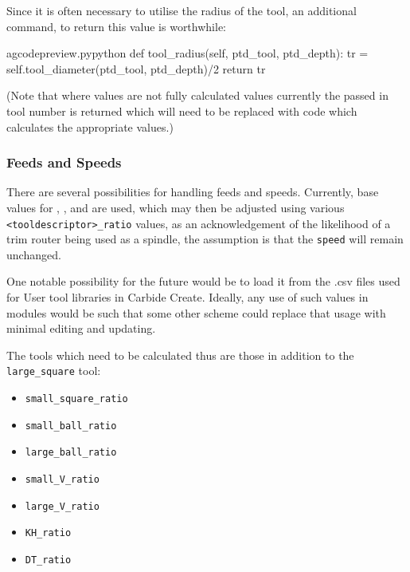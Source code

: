 \documentclass{ltxdoc}
\begin{document}
Since it is often necessary to utilise the radius of the tool, an additional command,  to return this value is worthwhile:
 
\lstset{firstnumber=\thegcpy}
\begin{writecode}{a}{gcodepreview.py}{python}
    def tool_radius(self, ptd_tool, ptd_depth):
        tr = self.tool_diameter(ptd_tool, ptd_depth)/2
        return tr

\end{writecode}
\addtocounter{gcpy}{4}
 
(Note that where values are not fully calculated values currently the passed in tool number is returned which will need to be replaced with code which calculates the appropriate values.)

\subsubsection{Feeds and Speeds}

There are several possibilities for handling feeds and speeds. Currently, base values for , , and  are used, which may then be adjusted using various \verb|<tooldescriptor>_ratio| values, as an acknowledgement of the likelihood of a trim router being used as a spindle, the assumption is that the \texttt{speed} will remain unchanged.

One notable possibility for the future would be to load it from the .csv files used for User tool libraries in Carbide Create. Ideally, any use of such values in modules would be such that some other scheme could replace that usage with minimal editing and updating.

The tools which need to be calculated thus are those in addition to the \verb|large_square| tool:

\begin{itemize}
\item \verb|small_square_ratio|
\item \verb|small_ball_ratio|
\item \verb|large_ball_ratio|
\item \verb|small_V_ratio|
\item \verb|large_V_ratio|
\item \verb|KH_ratio|
\item \verb|DT_ratio|
\end{itemize}
\end{document}
